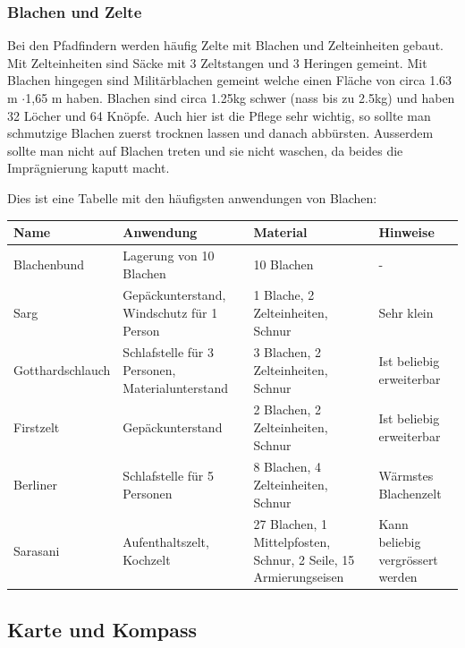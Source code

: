 \subsubsection{Blachen und Zelte}
Bei den Pfadfindern werden häufig Zelte mit Blachen und Zelteinheiten gebaut. Mit Zelteinheiten sind Säcke mit 3 Zeltstangen und 3 Heringen gemeint. Mit Blachen hingegen sind Militärblachen gemeint welche einen Fläche von circa 1.63 m $\cdot$1,65 m haben. Blachen sind circa 1.25kg schwer (nass bis zu 2.5kg) und haben 32 Löcher und 64 Knöpfe. Auch hier ist die Pflege sehr wichtig, so sollte man schmutzige Blachen zuerst trocknen lassen und danach abbürsten. Ausserdem sollte man nicht auf Blachen treten und sie nicht waschen, da beides die Imprägnierung kaputt macht. \par Dies ist eine Tabelle mit den häufigsten anwendungen von Blachen:

\begin{center}
\begin{tabularx}{\textwidth}{X|X|X|X}
    \textbf{Name} & \textbf{Anwendung} & \textbf{Material} & \textbf{Hinweise} \\\hline
    Blachenbund & Lagerung von 10 Blachen & 10 Blachen & - \\\hline
    Sarg & Gepäckunterstand, Windschutz für 1 Person & 1 Blache, 2 Zelteinheiten, Schnur & Sehr klein \\\hline
    Gotthardschlauch & Schlafstelle für 3 Personen, Materialunterstand & 3 Blachen, 2 Zelteinheiten, Schnur & Ist beliebig erweiterbar \\\hline
    Firstzelt & Gepäckunterstand & 2 Blachen, 2 Zelteinheiten, Schnur & Ist beliebig erweiterbar \\\hline
    Berliner & Schlafstelle für 5 Personen & 8 Blachen, 4 Zelteinheiten, Schnur & Wärmstes Blachenzelt \\\hline
    Sarasani & Aufenthaltszelt, Kochzelt & 27 Blachen, 1 Mittelpfosten, Schnur, 2 Seile, 15 Armierungseisen & Kann beliebig vergrössert werden \\ 
\end{tabularx}
\end{center}

\subsection*{Karte und Kompass}
